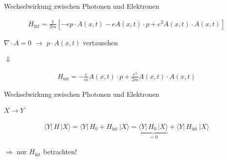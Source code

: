 \documentclass{beamer}
\begin{document}
\begin{frame}[t]{Wechselwirkung zwischen Photonen und Elektronen}
	\vspace*{-0.5cm}
	\begin{center}
		
		\begin{minipage}{0.35\textwidth}
			\begin{align*}
			H_{\text{int}} = \frac{1}{2m}\left[- e p \cdot A(x, t) - e A(x, t) \cdot p + e^2 A(x, t) \cdot A(x, t) \right]
			\end{align*}
		\end{minipage}
		
		\vspace*{0.5cm}
		
		$\nabla \cdot A = 0$ $\rightarrow$ $p \cdot A(x, t)$ vertauschen
				
		$\Downarrow$
		
		\begin{minipage}{0.35\textwidth}
			\begin{align*}
				H_{\text{int}} = -\frac{e}{m} A(x, t) \cdot p + \frac{e^2}{2m}A(x, t) \cdot A(x, t)
			\end{align*}
		\end{minipage}
	\end{center}
\end{frame}

\begin{frame}[t]{Wechselwirkung zwischen Photonen und Elektronen}
	\begin{center}
		

		$X \rightarrow Y$
		
		\begin{minipage}{0.35\textwidth}
			\begin{align*}
			\langle Y| \, H \, |X \rangle = \langle Y| \, H_0 + H_{\text{int}} \, |X \rangle = \underbrace{\langle Y| \, H_0 \, |X \rangle}_{=0} + \langle Y| \, H_{\text{int}} \, |X \rangle
			\end{align*}
		\end{minipage}
		
		\vspace*{0.5cm}
		$\Rightarrow$ nur $H_{\text{int}}$ betrachten!
		
	\end{center}
\end{frame}
\end{document}
